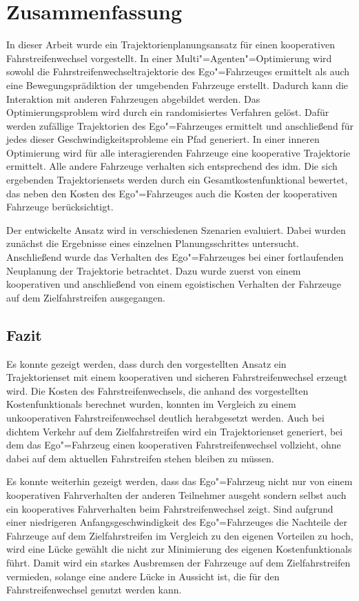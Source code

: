 
\chapter{Zusammenfassung}
\label{sec:conclusion_future-work}
In dieser Arbeit wurde ein Trajektorienplanungsansatz f\"ur einen kooperativen Fahrstreifenwechsel vorgestellt.
In einer Multi"=Agenten"=Optimierung wird sowohl die Fahrstreifenwechseltrajektorie des Ego"=Fahrzeuges ermittelt als auch eine Bewegungspr\"adiktion der umgebenden Fahrzeuge erstellt.
Dadurch kann die Interaktion mit anderen Fahrzeugen abgebildet werden.
Das Optimierungsproblem wird durch ein randomisiertes Verfahren gel\"ost.
Daf\"ur werden zuf\"allige Trajektorien des Ego"=Fahrzeuges ermittelt und anschlie{\ss}end f\"ur jedes dieser Geschwindigkeitsprobleme ein Pfad generiert.
In einer inneren Optimierung wird f\"ur alle interagierenden Fahrzeuge eine kooperative Trajektorie ermittelt.
Alle andere Fahrzeuge verhalten sich entsprechend des \gls{idm}.
Die sich ergebenden Trajektoriensets werden durch ein Gesamtkostenfunktional bewertet, das neben den Kosten des Ego"=Fahrzeuges auch die Kosten der kooperativen Fahrzeuge ber\"ucksichtigt.

Der entwickelte Ansatz wird in verschiedenen Szenarien evaluiert.
Dabei wurden zun\"achst die Ergebnisse eines einzelnen Planungsschrittes untersucht.
Anschlie{\ss}end wurde das Verhalten des Ego"=Fahrzeuges bei einer fortlaufenden Neuplanung der Trajektorie betrachtet.
Dazu wurde zuerst von einem kooperativen und anschlie{\ss}end von einem egoistischen Verhalten der Fahrzeuge auf dem Zielfahrstreifen ausgegangen.


\section{Fazit}
Es konnte gezeigt werden, dass durch den vorgestellten Ansatz ein Trajektorienset mit einem kooperativen und sicheren Fahrstreifenwechsel erzeugt wird.
Die Kosten des Fahrstreifenwechsels, die anhand des vorgestellten Kostenfunktionals berechnet wurden, konnten im Vergleich zu einem unkooperativen Fahrstreifenwechsel deutlich herabgesetzt werden.
Auch bei dichtem Verkehr auf dem Zielfahrstreifen wird ein Trajektorienset generiert, bei dem das Ego"=Fahrzeug einen kooperativen Fahrstreifenwechsel vollzieht, ohne dabei auf dem aktuellen Fahrstreifen stehen bleiben zu m\"ussen.

Es konnte weiterhin gezeigt werden, dass das Ego"=Fahrzeug nicht nur von einem kooperativen Fahrverhalten der anderen Teilnehmer ausgeht sondern selbst auch ein kooperatives Fahrverhalten beim Fahrstreifenwechsel zeigt.
Sind aufgrund einer niedrigeren Anfangsgeschwindigkeit des Ego"=Fahrzeuges die Nachteile der Fahrzeuge auf dem Zielfahrstreifen im Vergleich zu den eigenen Vorteilen zu hoch, wird eine L\"ucke gew\"ahlt die nicht zur Minimierung des eigenen Kostenfunktionals f\"uhrt.
Damit wird ein starkes Ausbremsen der Fahrzeuge auf dem Zielfahrstreifen vermieden, solange eine andere L\"ucke in Aussicht ist, die f\"ur den Fahrstreifenwechsel genutzt werden kann.

